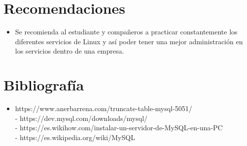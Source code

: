 \section{Recomendaciones} 
\begin{itemize}
	\item  Se recomienda al estudiante y compañeros a practicar constantemente  los diferentes servicios de Linux  y así poder tener una mejor administración en los servicios dentro de una empresa.
\end{itemize}

\section{Bibliografía} 
\begin{itemize}
    \item  https://www.anerbarrena.com/truncate-table-mysql-5051/
\\- https://dev.mysql.com/downloads/mysql/
\\- https://es.wikihow.com/instalar-un-servidor-de-MySQL-en-una-PC
\\- https://es.wikipedia.org/wiki/MySQL
\end{itemize}

